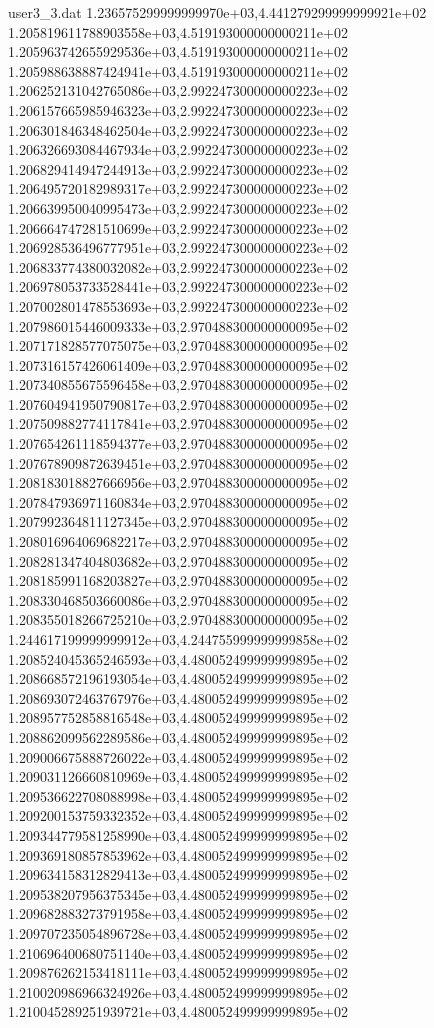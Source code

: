 \begin{filecontents}{user3_3.dat}
1.236575299999999970e+03,4.441279299999999921e+02
1.205819611788903558e+03,4.519193000000000211e+02
1.205963742655929536e+03,4.519193000000000211e+02
1.205988638887424941e+03,4.519193000000000211e+02
1.206252131042765086e+03,2.992247300000000223e+02
1.206157665985946323e+03,2.992247300000000223e+02
1.206301846348462504e+03,2.992247300000000223e+02
1.206326693084467934e+03,2.992247300000000223e+02
1.206829414947244913e+03,2.992247300000000223e+02
1.206495720182989317e+03,2.992247300000000223e+02
1.206639950040995473e+03,2.992247300000000223e+02
1.206664747281510699e+03,2.992247300000000223e+02
1.206928536496777951e+03,2.992247300000000223e+02
1.206833774380032082e+03,2.992247300000000223e+02
1.206978053733528441e+03,2.992247300000000223e+02
1.207002801478553693e+03,2.992247300000000223e+02
1.207986015446009333e+03,2.970488300000000095e+02
1.207171828577075075e+03,2.970488300000000095e+02
1.207316157426061409e+03,2.970488300000000095e+02
1.207340855675596458e+03,2.970488300000000095e+02
1.207604941950790817e+03,2.970488300000000095e+02
1.207509882774117841e+03,2.970488300000000095e+02
1.207654261118594377e+03,2.970488300000000095e+02
1.207678909872639451e+03,2.970488300000000095e+02
1.208183018827666956e+03,2.970488300000000095e+02
1.207847936971160834e+03,2.970488300000000095e+02
1.207992364811127345e+03,2.970488300000000095e+02
1.208016964069682217e+03,2.970488300000000095e+02
1.208281347404803682e+03,2.970488300000000095e+02
1.208185991168203827e+03,2.970488300000000095e+02
1.208330468503660086e+03,2.970488300000000095e+02
1.208355018266725210e+03,2.970488300000000095e+02
1.244617199999999912e+03,4.244755999999999858e+02
1.208524045365246593e+03,4.480052499999999895e+02
1.208668572196193054e+03,4.480052499999999895e+02
1.208693072463767976e+03,4.480052499999999895e+02
1.208957752858816548e+03,4.480052499999999895e+02
1.208862099562289586e+03,4.480052499999999895e+02
1.209006675888726022e+03,4.480052499999999895e+02
1.209031126660810969e+03,4.480052499999999895e+02
1.209536622708088998e+03,4.480052499999999895e+02
1.209200153759332352e+03,4.480052499999999895e+02
1.209344779581258990e+03,4.480052499999999895e+02
1.209369180857853962e+03,4.480052499999999895e+02
1.209634158312829413e+03,4.480052499999999895e+02
1.209538207956375345e+03,4.480052499999999895e+02
1.209682883273791958e+03,4.480052499999999895e+02
1.209707235054896728e+03,4.480052499999999895e+02
1.210696400680751140e+03,4.480052499999999895e+02
1.209876262153418111e+03,4.480052499999999895e+02
1.210020986966324926e+03,4.480052499999999895e+02
1.210045289251939721e+03,4.480052499999999895e+02

\end{filecontents}
